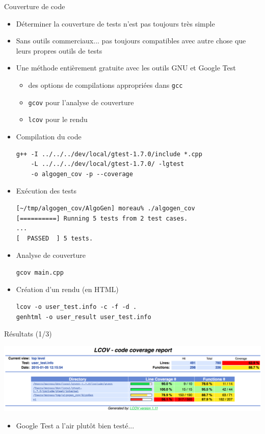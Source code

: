 \begin{frame}{Couverture de code}
\begin{itemize}
\item Déterminer la couverture de tests n'est pas toujours très simple
\item Sans outils commerciaux... pas toujours compatibles avec autre chose que leurs propres outils de tests
\item Une méthode entièrement gratuite avec les outils GNU et Google Test
\begin{itemize}
\item des options de compilations appropriées dans \texttt{gcc}
\item \texttt{gcov} pour l'analyse de couverture
\item \texttt{lcov} pour le rendu
\end{itemize}

\end{itemize}
\end{frame}

\begin{frame}[fragile]
\begin{itemize}
\item Compilation du code 
\begin{verbatim}
g++ -I ../../../dev/local/gtest-1.7.0/include *.cpp 
	-L ../../../dev/local/gtest-1.7.0/ -lgtest 
	-o algogen_cov -p --coverage
\end{verbatim}
\item Exécution des tests
\begin{verbatim}
[~/tmp/algogen_cov/AlgoGen] moreau% ./algogen_cov 
[==========] Running 5 tests from 2 test cases.
...
[  PASSED  ] 5 tests.
\end{verbatim}
\item Analyse de couverture
\begin{verbatim}
gcov main.cpp
\end{verbatim}
\item Création d'un rendu (en HTML)
\begin{verbatim}
lcov -o user_test.info -c -f -d .
genhtml -o user_result user_test.info
\end{verbatim}
\end{itemize}
\end{frame}

\begin{frame}{Résultats (1/3)}
\begin{center}
\includegraphics[width=.9\textwidth]{fig/lcov_top.png}
\end{center}
\begin{itemize}
\item Google Test a l'air plutôt bien testé...
\end{itemize}
\end{frame}

